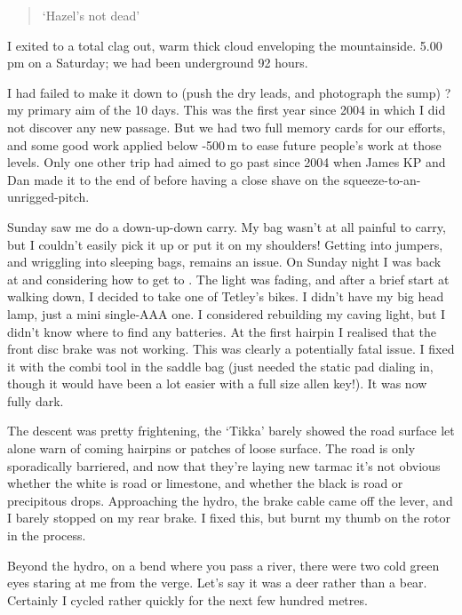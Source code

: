 \begin{quote} `Hazel's not dead' \end{quote}

I exited to a total clag out, warm thick cloud enveloping the mountainside.
5.00\,pm on a Saturday; we had been underground 92 hours.

I had failed to make it down to  (push the dry leads, and photograph the sump) ? my primary aim of the 10 days. This was the first year since 2004 in which I did not discover any new passage. But we had two full memory cards for our efforts, and some good work applied below -500\,m to ease future people's work at those levels. Only one other trip had aimed to go past  since 2004 when James KP and Dan made it to the end of  before having a close shave on the squeeze-to-an-unrigged-pitch.

Sunday saw me do a down-up-down carry. My bag wasn't at all painful to carry, but I couldn't easily pick it up or put it on my shoulders! Getting into jumpers, and wriggling into sleeping bags, remains an issue.
On Sunday night I was back at  and considering how to get to . The light was fading, and after a brief start at walking down, I decided to take one of Tetley's bikes. I didn't have my big head lamp, just a mini single-AAA one. I considered rebuilding my caving light, but I didn't know where to find any batteries.
At the first hairpin I realised that the front disc brake was not working. This was clearly a potentially fatal issue.
I fixed it with the combi tool in the saddle bag (just needed the static pad dialing in, though it would have been a lot easier with a full size allen key!). It was now fully dark.

The descent was pretty frightening, the `Tikka' barely showed the road surface let alone warn of coming hairpins or patches of loose surface. The road is only sporadically barriered, and now that they're laying new tarmac it's not obvious whether the white is road or limestone, and whether the black is road or precipitous drops. Approaching the hydro, the brake cable came off the lever, and I barely stopped on my rear brake. I fixed this, but burnt my thumb on the rotor in the process.

Beyond the hydro, on a bend where you pass a river, there were two cold green eyes staring at me from the verge. Let's say it was a deer rather than a bear. Certainly I cycled rather quickly for the next few hundred metres.

